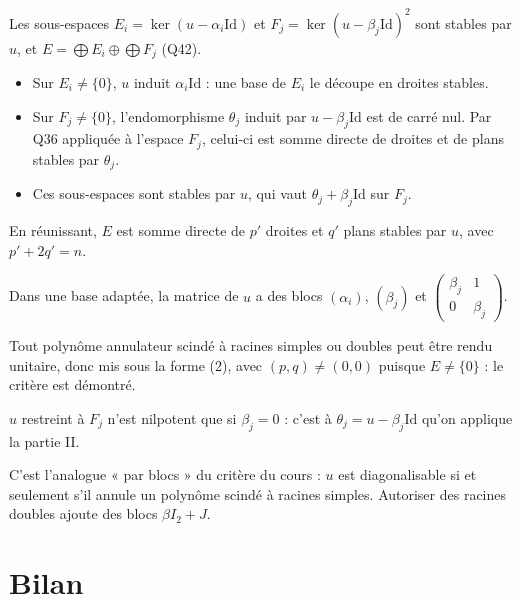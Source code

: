 \documentclass[11pt,a4paper]{article}
\providecommand{\tightlist}{\setlength{\itemsep}{0pt}\setlength{\parskip}{0pt}}
\newcommand{\equationajustee}[1]{%
  \sbox{\boiteequation}{$\displaystyle #1$}%
  \ifdim\wd\boiteequation>\linewidth
    \[\resizebox{\linewidth}{!}{\usebox{\boiteequation}}\]%
  \else
    \[#1\]%
  \fi}
\begin{document}
Les sous-espaces \(E_i=\ker(u-\alpha_i\mathrm{Id})\) et \(F_j=\ker(u-\beta_j\mathrm{Id})^2\) sont stables par \(u\), et \(E=\bigoplus E_i\oplus\bigoplus F_j\) (Q42).

\begin{itemize}
\tightlist
\item
  Sur \(E_i\neq\{0\}\), \(u\) induit \(\alpha_i\mathrm{Id}\) : une base de \(E_i\) le découpe en droites stables.
\item
  Sur \(F_j\neq\{0\}\), l'endomorphisme \(\theta_j\) induit par \(u-\beta_j\mathrm{Id}\) est de carré nul. Par Q36 appliquée à l'espace \(F_j\), celui-ci est somme directe de droites et de plans stables par \(\theta_j\).
\item
  Ces sous-espaces sont stables par \(u\), qui vaut \(\theta_j+\beta_j\mathrm{Id}\) sur \(F_j\).
\end{itemize}

En réunissant, \(E\) est somme directe de \(p'\) droites et \(q'\) plans stables par \(u\), avec \(p'+2q'=n\).

Dans une base adaptée, la matrice de \(u\) a des blocs \((\alpha_i)\), \((\beta_j)\) et \(\begin{pmatrix}\beta_j&1\\0&\beta_j\end{pmatrix}\).

\equationajustee{\boxed{u\in\mathcal D.}}

Tout polynôme annulateur scindé à racines simples ou doubles peut être rendu unitaire, donc mis sous la forme (2), avec \((p,q)\neq(0,0)\) puisque \(E\neq\{0\}\) : le critère est démontré.

\begin{piege}

\(u\) restreint à \(F_j\) n'est nilpotent que si \(\beta_j=0\) : c'est à \(\theta_j=u-\beta_j\mathrm{Id}\) qu'on applique la partie II.

\end{piege}

\begin{methode}

C'est l'analogue « par blocs » du critère du cours : \(u\) est diagonalisable si et seulement s'il annule un polynôme scindé à racines simples. Autoriser des racines doubles ajoute des blocs \(\beta I_2+J\).

\end{methode}

\hypertarget{bilan}{%
\section{Bilan}\label{bilan}}
\end{document}
